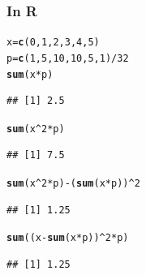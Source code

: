 \documentclass[t,xcolor=pdftex,dvipsnames,table]{beamer}\usepackage[]{graphicx}\usepackage[]{color}
\makeatletter
\newcommand{\hlnum}[1]{\textcolor[rgb]{0.686,0.059,0.569}{#1}}%
\newcommand{\hlopt}[1]{\textcolor[rgb]{0,0,0}{#1}}%
\newcommand{\hlstd}[1]{\textcolor[rgb]{0.345,0.345,0.345}{#1}}%
\newcommand{\hlkwb}[1]{\textcolor[rgb]{0.69,0.353,0.396}{#1}}%
\newcommand{\hlkwd}[1]{\textcolor[rgb]{0.737,0.353,0.396}{\textbf{#1}}}%
\newenvironment{kframe}{%
 \def\at@end@of@kframe{}%
 \ifinner\ifhmode%
  \def\at@end@of@kframe{\end{minipage}}%
  \begin{minipage}{\columnwidth}%
 \fi\fi%
 \def\FrameCommand##1{\hskip\@totalleftmargin \hskip-\fboxsep
 \colorbox{shadecolor}{##1}\hskip-\fboxsep
     \hskip-\linewidth \hskip-\@totalleftmargin \hskip\columnwidth}%
 \MakeFramed {\advance\hsize-\width
   \@totalleftmargin\z@ \linewidth\hsize
   \@setminipage}}%
 {\par\unskip\endMakeFramed%
 \at@end@of@kframe}
\newenvironment{knitrout}{}{} %
\makeatother
\begin{document}
\begin{frame}[fragile]\frametitle{In R}
\begin{knitrout}
\color{fgcolor}\begin{kframe}
\begin{alltt}
\hlstd{x}\hlkwb{=}\hlkwd{c}\hlstd{(}\hlnum{0}\hlstd{,}\hlnum{1}\hlstd{,}\hlnum{2}\hlstd{,}\hlnum{3}\hlstd{,}\hlnum{4}\hlstd{,}\hlnum{5}\hlstd{)}
\hlstd{p}\hlkwb{=}\hlkwd{c}\hlstd{(}\hlnum{1}\hlstd{,}\hlnum{5}\hlstd{,}\hlnum{10}\hlstd{,}\hlnum{10}\hlstd{,}\hlnum{5}\hlstd{,}\hlnum{1}\hlstd{)}\hlopt{/}\hlnum{32}
\hlkwd{sum}\hlstd{(x}\hlopt{*}\hlstd{p)}
\end{alltt}
\begin{verbatim}
## [1] 2.5
\end{verbatim}
\begin{alltt}
\hlkwd{sum}\hlstd{(x}\hlopt{^}\hlnum{2}\hlopt{*}\hlstd{p)}
\end{alltt}
\begin{verbatim}
## [1] 7.5
\end{verbatim}
\begin{alltt}
\hlkwd{sum}\hlstd{(x}\hlopt{^}\hlnum{2}\hlopt{*}\hlstd{p)}\hlopt{-}\hlstd{(}\hlkwd{sum}\hlstd{(x}\hlopt{*}\hlstd{p))}\hlopt{^}\hlnum{2}
\end{alltt}
\begin{verbatim}
## [1] 1.25
\end{verbatim}
\begin{alltt}
\hlkwd{sum}\hlstd{((x}\hlopt{-}\hlkwd{sum}\hlstd{(x}\hlopt{*}\hlstd{p))}\hlopt{^}\hlnum{2}\hlopt{*}\hlstd{p)}
\end{alltt}
\begin{verbatim}
## [1] 1.25
\end{verbatim}
\end{kframe}
\end{knitrout}
\end{frame}
\end{document}
